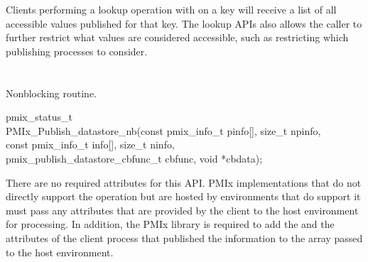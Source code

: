Clients performing a lookup operation with  on
a key will
receive a list of all accessible values published for that key.  The lookup \acp{API} also allows the caller to further
restrict what values are considered accessible, such as restricting which publishing processes to consider.

\section{}


\summary

Nonblocking  routine.

\format

\cspecificstart
\begin{codepar}
pmix_status_t \\
PMIx_Publish_datastore_nb(const pmix_info_t pinfo[], size_t npinfo, \\
\hspace*{12\sigspace}const pmix_info_t info[], size_t ninfo, \\
\hspace*{16\sigspace}pmix_publish_datastore_cbfunc_t cbfunc, void *cbdata);
\end{codepar}
\cspecificend

\begin{arglist}
\end{arglist}

\returnsimplenb

\reqattrstart
There are no required attributes for this \ac{API}. \ac{PMIx} implementations that do not directly support the operation but are hosted by environments that do support it must pass any attributes that are provided by the client to the host environment for processing. In addition, the \ac{PMIx} library is required to add the  and the  attributes of the client process that published the information to the  array passed to the host environment.
\reqattrend

